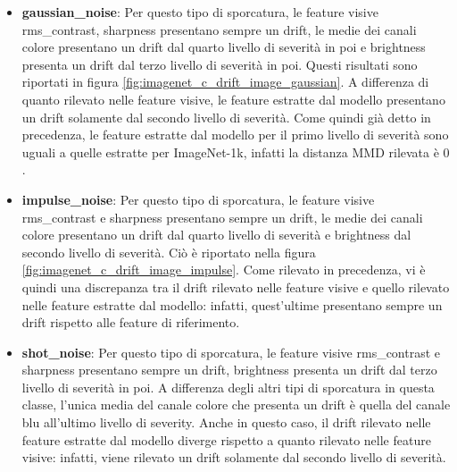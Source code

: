 \begin{itemize}
  \item \textbf{gaussian\_noise}: Per questo tipo di sporcatura, le feature visive rms\_contrast, sharpness presentano sempre un drift, le medie dei canali colore presentano un drift dal quarto livello di severità in poi e brightness presenta un drift dal terzo livello di severità in poi. Questi risultati sono riportati in figura \ref{fig:imagenet_c_drift_image_gaussian}. A differenza di quanto rilevato nelle feature visive, le feature estratte dal modello presentano un drift solamente dal secondo livello di severità. Come quindi già detto in precedenza, le feature estratte dal modello per il primo livello di severità sono uguali a quelle estratte per ImageNet-1k, infatti la distanza MMD rilevata è $0$.
  \item \textbf{impulse\_noise}: Per questo tipo di sporcatura, le feature visive rms\_contrast e sharpness presentano sempre un drift, le medie dei canali colore presentano un drift dal quarto livello di severità e brightness dal secondo livello di severità. Ciò è riportato nella figura \ref{fig:imagenet_c_drift_image_impulse}. Come rilevato in precedenza, vi è quindi una discrepanza tra il drift rilevato nelle feature visive e quello rilevato nelle feature estratte dal modello: infatti, quest'ultime presentano sempre un drift rispetto alle feature di riferimento.
  \item \textbf{shot\_noise}: Per questo tipo di sporcatura, le feature visive rms\_contrast e sharpness presentano sempre un drift, brightness presenta un drift dal terzo livello di severità in poi. A differenza degli altri tipi di sporcatura in questa classe, l'unica media del canale colore che presenta un drift è quella del canale blu all'ultimo livello di severity.
  Anche in questo caso, il drift rilevato nelle feature estratte dal modello diverge rispetto a quanto rilevato nelle feature visive: infatti, viene rilevato un drift solamente dal secondo livello di severità. 
\end{itemize}
